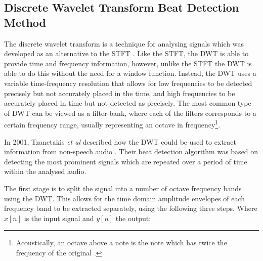 \documentclass[a4paper, 11pt]{article}
\begin{document}
\subsection{Discrete Wavelet Transform Beat Detection Method}
The discrete wavelet transform is a technique for analysing signals which was developed as an alternative to the STFT \cite{tzane1}. Like the STFT, the DWT is able to provide time and frequency information, however, unlike the STFT the DWT is able to do this without the need for a window function. Instead, the DWT uses a variable time-frequency resolution that allows for low frequencies to be detected precisely but not accurately placed in the time, and high frequencies to be accurately placed in time but not detected as precisely. The most common type of DWT can be viewed as a filter-bank, where each of the filters corresponds to a certain frequency range, usually representing an octave in frequency\footnote{Acoustically, an octave above a note is the note which has twice the frequency of the original \cite{oxford-comp}.}\cite{tzane2}.

In 2001, Tzanetakis \textit{et al} described how the DWT could be used to extract information from non-speech audio \cite{tzane1}. Their beat detection algorithm was based on detecting the most prominent signals which are repeated over a period of time within the analysed audio. \par

The first stage is to split the signal into a number of octave frequency bands using the DWT. This allows for the time domain amplitude envelopes of each frequency band to be extracted separately, using the following three steps. Where $x[n]$ is the input signal and $y[n]$ the output: 
\end{document}
